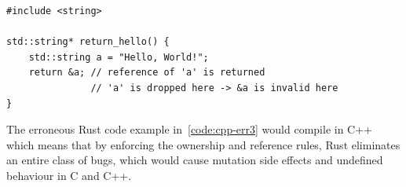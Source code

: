 \documentclass[11pt,
               a4paper,
               bibtotoc,
               idxtotoc,
               headsepline,
               footsepline,
               footexclude,
               BCOR12mm,
               DIV13,
               openany,   %
               ]
               {scrbook}
\begin{document}
\vspace{0.5em}
\begin{lstlisting}[style=eclipse-cpp, basicstyle=\ttfamily\small, caption=C++ code breaks Rule 1 and 5 but compiles with a warning, label=code:cpp-err3]
#include <string>

std::string* return_hello() {
    std::string a = "Hello, World!";
    return &a; // reference of 'a' is returned
               // 'a' is dropped here -> &a is invalid here
}
\end{lstlisting}

The erroneous Rust code example in~\autoref{code:cpp-err3} would compile in C++ which means that by enforcing the ownership and reference rules, Rust eliminates an entire class of bugs, which would cause mutation side effects and undefined behaviour in C and C++.







    
\end{document}
